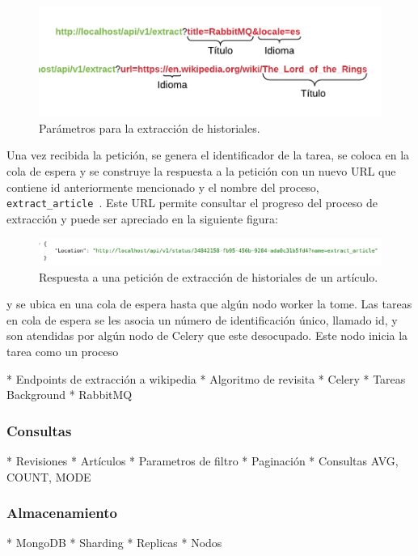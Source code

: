 \begin{figure}[H]
	\centering
		\includegraphics[width=1\textwidth]{figures/extract_url_format}
	\caption{Parámetros para la extracción de historiales.}
	\label{fig:extract_url_format}
\end{figure}

Una vez recibida la petición, se genera el identificador de la tarea, se coloca en la cola de espera y se construye la respuesta a la petición
con un nuevo URL que contiene id anteriormente mencionado y el nombre del proceso, \texttt{ extract\_article }.
Este URL permite consultar el progreso del proceso de extracción y puede ser apreciado en la siguiente figura:

\begin{figure}[H]
	\centering
		\includegraphics[width=1\textwidth]{figures/extract_response}
	\caption{Respuesta a una petición de extracción de historiales de un artículo.}
	\label{fig:extract_response}
\end{figure}



 y se ubica en una cola de espera hasta que algún nodo worker la tome. Las tareas en cola de espera se les asocia un número de
 identificación único,
llamado id, y son atendidas por algún nodo de Celery que este desocupado. Este nodo inicia la tarea como un proceso


* Endpoints de extracción a wikipedia
* Algoritmo de revisita
* Celery
* Tareas Background
* RabbitMQ

\subsubsection{Consultas}

* Revisiones
* Artículos
* Parametros de filtro
* Paginación
* Consultas AVG, COUNT, MODE

\subsubsection{Almacenamiento}

* MongoDB
* Sharding
* Replicas
* Nodos
